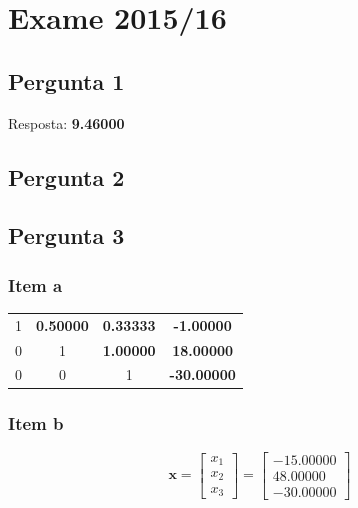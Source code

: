 \setcounter{chapter}{14}
\chapter{Exame 2015/16}
{
\renewcommand{\thesubsection}{\thesection\alph{subsection}}

\section{Pergunta 1}

Resposta: \textbf{9.46000}

\section{Pergunta 2}

\section{Pergunta 3}

\subsection{Item a}
\begin{center}
    \begin{tabular}{ c c c | c}
        1 & \textbf{0.50000} & \textbf{0.33333} & \textbf{-1.00000} \\
        0 & 1 & \textbf{1.00000} & \textbf{18.00000} \\
        0 & 0 & 1 & \textbf{-30.00000}
    \end{tabular}
\end{center}
\subsection{Item b}
\begin{equation*}
    \mathbf{x}
    =\begin{bmatrix} x_1 \\ x_2 \\ x_3 \end{bmatrix}
    =\begin{bmatrix} -15.00000 \\ 48.00000 \\ -30.00000 \end{bmatrix}
\end{equation*}
}
